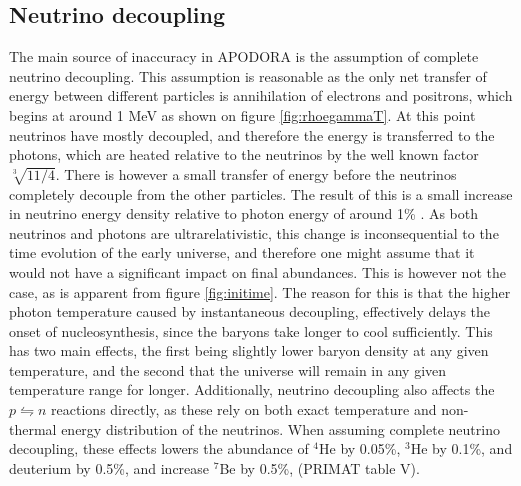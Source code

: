 \subsection{Neutrino decoupling}
\label{sec:decoupling}
The main source of inaccuracy in APODORA is the assumption of complete neutrino decoupling. This assumption is reasonable as the only net transfer of energy between different particles is annihilation of electrons and positrons, which begins at around 1 MeV as shown on figure \ref{fig:rhoegammaT}. At this point neutrinos have mostly  decoupled, and therefore the energy is transferred to the photons, which are heated relative to the neutrinos by the well known factor $\sqrt[3]{11/4}$. There is however a small transfer of energy before the neutrinos completely decouple from the other particles. The result of this is a small increase in neutrino energy density relative to photon energy of around 1\% \cite{Hannestad:1995rs}. As both neutrinos and photons are ultrarelativistic, this change is inconsequential to the time evolution of the early universe, and therefore one might assume that it would not have a significant impact on final abundances. This is however not the case, as is apparent from figure \ref{fig:initime}. The reason for this is that the higher photon temperature caused by instantaneous decoupling, effectively delays the onset of nucleosynthesis, since the baryons take longer to cool sufficiently. This has two main effects, the first being slightly lower baryon density at any given temperature, and the second that the universe will remain in any given temperature range for longer. Additionally, neutrino decoupling also affects the $p\leftrightharpoons n$ reactions directly, as these rely on both exact temperature and non-thermal energy distribution of the neutrinos. When assuming complete neutrino decoupling, these effects lowers the abundance of ${}^4$He by 0.05\%, ${}^3$He by 0.1\%, and deuterium by 0.5\%, and increase ${}^7$Be by 0.5\%, (PRIMAT table V\cite{PRIMAT}). 

